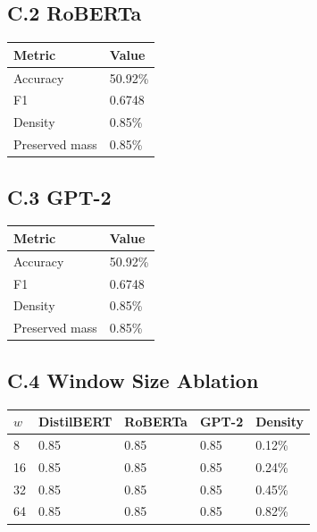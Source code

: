 \subsection{C.2 RoBERTa}

\begin{table}[H]
\centering
\small
\begin{tabular}{ll}
\toprule
\textbf{Metric} & \textbf{Value} \\
\midrule
Accuracy & 50.92\% \\
F1 & 0.6748 \\
Density & 0.85\% \\
Preserved mass & 0.85\% \\
\bottomrule
\end{tabular}
\end{table}

\subsection{C.3 GPT-2}

\begin{table}[H]
\centering
\small
\begin{tabular}{ll}
\toprule
\textbf{Metric} & \textbf{Value} \\
\midrule
Accuracy & 50.92\% \\
F1 & 0.6748 \\
Density & 0.85\% \\
Preserved mass & 0.85\% \\
\bottomrule
\end{tabular}
\end{table}

\subsection{C.4 Window Size Ablation}

\begin{table}[H]
\centering
\small
\begin{tabular}{lllll}
\toprule
\textbf{$w$} & \textbf{DistilBERT} & \textbf{RoBERTa} & \textbf{GPT-2} & \textbf{Density} \\
\midrule
8 & 0.85 & 0.85 & 0.85 & 0.12\% \\
16 & 0.85 & 0.85 & 0.85 & 0.24\% \\
32 & 0.85 & 0.85 & 0.85 & 0.45\% \\
64 & 0.85 & 0.85 & 0.85 & 0.82\% \\
\bottomrule
\end{tabular}
\end{table}

